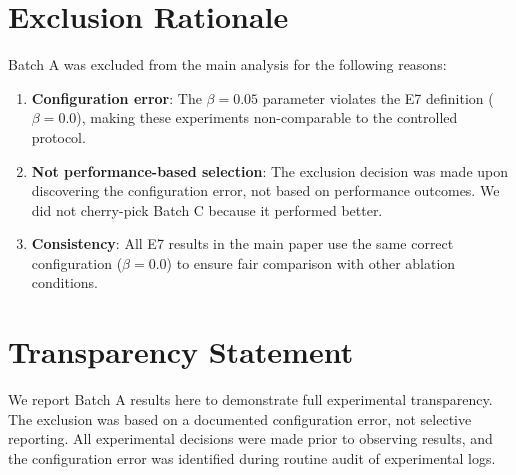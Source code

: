 \documentclass[10pt,a4paper]{article}
\begin{document}
\section{Exclusion Rationale}

Batch A was excluded from the main analysis for the following reasons:
\begin{enumerate}
\item \textbf{Configuration error}: The $\beta=0.05$ parameter violates the E7 definition ($\beta=0.0$), making these experiments non-comparable to the controlled protocol.
\item \textbf{Not performance-based selection}: The exclusion decision was made upon discovering the configuration error, not based on performance outcomes. We did not cherry-pick Batch C because it performed better.
\item \textbf{Consistency}: All E7 results in the main paper use the same correct configuration ($\beta=0.0$) to ensure fair comparison with other ablation conditions.
\end{enumerate}

\section{Transparency Statement}

We report Batch A results here to demonstrate full experimental transparency. The exclusion was based on a documented configuration error, not selective reporting. All experimental decisions were made prior to observing results, and the configuration error was identified during routine audit of experimental logs.
\end{document}

